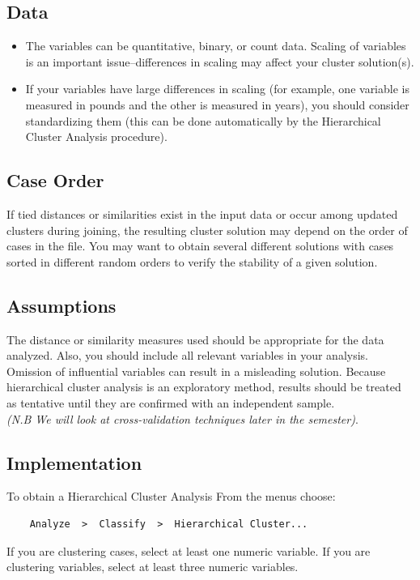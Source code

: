 	\subsection{Data}  
	\begin{itemize}
		\item The variables can be quantitative, binary, or count data. Scaling of variables is an important issue--differences in scaling may affect your cluster solution(s). 
		\item If your variables have large differences in scaling (for example, one variable is measured in pounds and the other is measured in years), you should consider standardizing them (this can be done automatically by the Hierarchical Cluster Analysis procedure).
	\end{itemize}
	
	\subsection{Case Order} If tied distances or similarities exist in the input data or occur among updated clusters during joining, the resulting cluster solution may depend on the order of cases in the file. You may want to obtain several different solutions with cases sorted in different random orders to verify the stability of a given solution.
	\subsection{Assumptions}  The distance or similarity measures used should be appropriate for the data analyzed. Also, you should include all relevant variables in your analysis. Omission of influential variables can result in a misleading solution. Because hierarchical cluster analysis is an exploratory method, results should be treated as tentative until they are confirmed with an independent sample. \\ \textit{ (N.B We will look at cross-validation techniques later in the semester)}.
	
	
	
	\subsection{Implementation}
	
	
	To obtain a Hierarchical Cluster Analysis
	From the menus choose:
	\begin{verbatim}
	Analyze  >  Classify  >  Hierarchical Cluster...
	\end{verbatim}
	If you are clustering cases, select at least one numeric variable. If you are clustering variables, select at least three numeric variables. 
	
